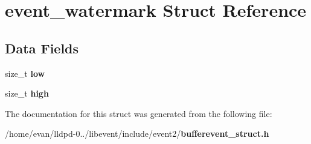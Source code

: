\section{event\-\_\-watermark \-Struct \-Reference}
\label{structevent__watermark}
\subsection*{\-Data \-Fields}
\begin{DoxyCompactItemize}
\item 
size\-\_\-t {\bfseries low}\label{structevent__watermark_ae33fdbfb6d7f139dc7c25bd1246eb58a}

\item 
size\-\_\-t {\bfseries high}\label{structevent__watermark_a4cf8771acd7ac07d983b4861cce53316}

\end{DoxyCompactItemize}


\-The documentation for this struct was generated from the following file\-:\begin{DoxyCompactItemize}
\item 
/home/evan/lldpd-\/0../libevent/include/event2/{\bf bufferevent\-\_\-struct.\-h}\end{DoxyCompactItemize}

